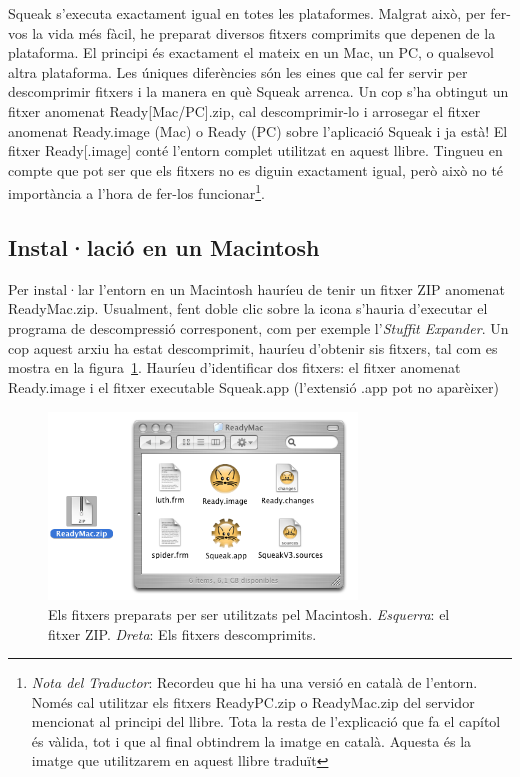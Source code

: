 Squeak s'executa exactament igual en totes les plataformes. Malgrat això, per fer-vos la vida més fàcil, he preparat diversos fitxers comprimits que depenen de la plataforma. El principi és exactament el mateix en un Mac, un PC, o qualsevol altra plataforma. Les úniques diferències són les eines que cal fer servir per descomprimir fitxers i la manera en què Squeak arrenca. Un cop s'ha obtingut un fitxer anomenat \textsf{Ready[Mac/PC].zip}, cal descomprimir-lo i arrosegar el fitxer anomenat \textsf{Ready.image} (Mac) o \textsf{Ready} (PC) sobre l'aplicació \textsf{Squeak} i ja està! El fitxer \textsf{Ready}[\textsf{.image}] conté l'entorn complet utilitzat en aquest llibre. Tingueu en compte que pot ser que els fitxers no es diguin exactament igual, però això no té importància a l'hora de fer-los funcionar\footnote{\emph{Nota del Traductor}: Recordeu que hi ha una versió en català de l'entorn. Només cal utilitzar els fitxers \textsf{ReadyPC.zip} o \textsf{ReadyMac.zip} del servidor mencionat al principi del llibre. Tota la resta de l'explicació que fa el capítol és vàlida, tot i que al final obtindrem la imatge en català. Aquesta és la imatge que utilitzarem en aquest llibre traduït}.

\subsection{Instal·lació en un Macintosh}
Per instal·lar l'entorn en un Macintosh hauríeu de tenir un fitxer ZIP anomenat \textsf{ReadyMac.zip}. Usualment, fent doble clic sobre la icona s'hauria d'executar el programa de descompressió corresponent, com per exemple l'\emph{Stuffit Expander}. Un cop aquest arxiu ha estat descomprimit, hauríeu d'obtenir sis fitxers, tal com es mostra en la figura~\ref{fig0101}. Hauríeu d'identificar dos fitxers: el fitxer anomenat \textsf{Ready.image} i el fitxer executable \textsf{Squeak.app} (l'extensió \textsf{.app} pot no aparèixer)

\begin{figure}[h]
\begin{center}
\includegraphics[height=50mm ,width=82mm ]{Imatges/CarpetaReadyMac.png}
\end{center}
\caption{Els fitxers preparats per ser utilitzats pel Macintosh. \emph{Esquerra}: el fitxer ZIP. \emph{Dreta}: Els fitxers descomprimits.}
\label{fig0101}
\end{figure}

